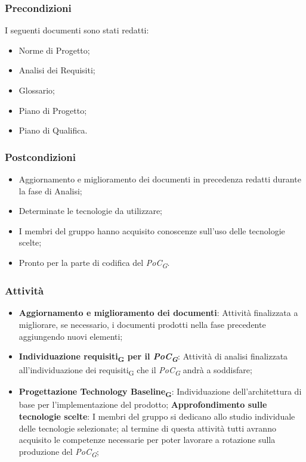 \subsubsection{Precondizioni}
I seguenti documenti sono stati redatti:
\begin{itemize}
	\item Norme di Progetto;
	\item Analisi dei Requisiti;
	\item Glossario;
    \item Piano di Progetto;
	\item Piano di Qualifica.
\end{itemize}

\subsubsection{Postcondizioni}\:
\begin{itemize}
	\item Aggiornamento e miglioramento dei documenti in precedenza redatti durante la fase di Analisi;
	\item Determinate le tecnologie da utilizzare;
	\item I membri del gruppo hanno acquisito conoscenze sull'uso delle tecnologie scelte;
	\item Pronto per la parte di codifica del \textit{PoC\textsubscript{G}}.
\end{itemize}

\subsubsection{Attività}\:
\begin{itemize}
	\item \textbf{Aggiornamento e miglioramento dei documenti}: Attività finalizzata a migliorare, se necessario, i documenti prodotti nella fase precedente aggiungendo nuovi elementi;
	\item \textbf{Individuazione requisiti\textsubscript{G} per il \textit{PoC\textsubscript{G}}}: Attività di analisi finalizzata all’individuazione dei requisiti\textsubscript{G} che il \textit{PoC\textsubscript{G}} andrà a soddisfare;
    \item \textbf{Progettazione Technology Baseline\textsubscript{G}}: Individuazione dell’architettura di base per l’implementazione del prodotto;
        \subitem \textbf{Approfondimento sulle tecnologie scelte}: I membri del gruppo si dedicano allo studio individuale delle tecnologie selezionate; al termine di questa attività tutti avranno acquisito le competenze necessarie per poter lavorare a rotazione sulla produzione del \textit{PoC\textsubscript{G}};
\end{itemize}

